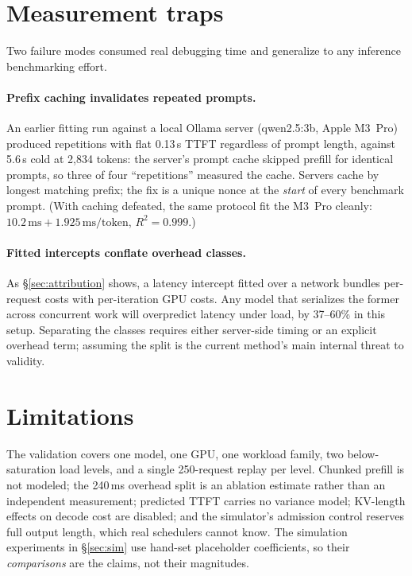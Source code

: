 \documentclass[11pt]{article}
\begin{document}
\section{Measurement traps}\label{sec:traps}

Two failure modes consumed real debugging time and generalize to any inference benchmarking effort.

\paragraph{Prefix caching invalidates repeated prompts.} An earlier fitting run against a local Ollama server (qwen2.5:3b, Apple M3~Pro) produced repetitions with flat 0.13\,s TTFT regardless of prompt length, against 5.6\,s cold at 2{,}834 tokens: the server's prompt cache skipped prefill for identical prompts, so three of four ``repetitions'' measured the cache. Servers cache by longest matching prefix; the fix is a unique nonce at the \emph{start} of every benchmark prompt. (With caching defeated, the same protocol fit the M3~Pro cleanly: $10.2\,\text{ms} + 1.925\,\text{ms/token}$, $R^2 = 0.999$.)

\paragraph{Fitted intercepts conflate overhead classes.} As \S\ref{sec:attribution} shows, a latency intercept fitted over a network bundles per-request costs with per-iteration GPU costs. Any model that serializes the former across concurrent work will overpredict latency under load, by 37--60\% in this setup. Separating the classes requires either server-side timing or an explicit overhead term; assuming the split is the current method's main internal threat to validity.

\section{Limitations}

The validation covers one model, one GPU, one workload family, two below-saturation load levels, and a single 250-request replay per level. Chunked prefill is not modeled; the 240\,ms overhead split is an ablation estimate rather than an independent measurement; predicted TTFT carries no variance model; KV-length effects on decode cost are disabled; and the simulator's admission control reserves full output length, which real schedulers cannot know. The simulation experiments in \S\ref{sec:sim} use hand-set placeholder coefficients, so their \emph{comparisons} are the claims, not their magnitudes.
\end{document}
